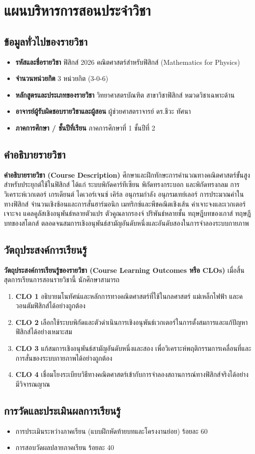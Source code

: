 \chapter*{แผนบริหารการสอนประจำวิชา}

\section*{ข้อมูลทั่วไปของรายวิชา}
\begin{itemize}
    \item \textbf{รหัสและชื่อรายวิชา} ฟิสิกส์ 2026 คณิตศาสตร์สำหรับฟิสิกส์ (Mathematics for Physics)
    \item \textbf{จำนวนหน่วยกิต} 3 หน่วยกิต (3-0-6)
    \item \textbf{หลักสูตรและประเภทของรายวิชา} วิทยาศาสตรบัณฑิต สาขาวิชาฟิสิกส์ หมวดวิชาเฉพาะด้าน
    \item \textbf{อาจารย์ผู้รับผิดชอบรายวิชาและผู้สอน} ผู้ช่วยศาสตราจารย์ ดร.ชีวะ ทัศนา
    \item \textbf{ภาคการศึกษา / ชั้นปีที่เรียน} ภาคการศึกษาที่ 1 ชั้นปีที่ 2
\end{itemize}

\section*{คำอธิบายรายวิชา}
\textbf{คำอธิบายรายวิชา (Course Description)} ศึกษาและฝึกทักษะการคำนวณทางคณิตศาสตร์ขั้นสูงสำหรับประยุกต์ใช้ในฟิสิกส์ ได้แก่ ระบบพิกัดคาร์ทีเซียน พิกัดทรงกระบอก และพิกัดทรงกลม การวิเคราะห์เวกเตอร์ เกรเดียนต์ ไดเวอร์เจนซ์ เคิร์ล อนุกรมกำลัง อนุกรมเทย์เลอร์ การประมาณค่าในทางฟิสิกส์ จำนวนเชิงซ้อนและการสั่นฮาร์มอนิก เมทริกซ์และพีชคณิตเชิงเส้น ค่าเจาะจงและเวกเตอร์เจาะจง แคลคูลัสเชิงอนุพันธ์หลายตัวแปร ตัวคูณลากรองจ์ ปริพันธ์หลายชั้น ทฤษฎีบทของเกาส์ ทฤษฎีบทของสโตกส์ ตลอดจนสมการเชิงอนุพันธ์สามัญอันดับหนึ่งและอันดับสองในการจำลองระบบกายภาพ

\section*{วัตถุประสงค์การเรียนรู้}
\textbf{วัตถุประสงค์การเรียนรู้ของรายวิชา (Course Learning Outcomes หรือ CLOs)} เมื่อสิ้นสุดการเรียนการสอนรายวิชานี้ นักศึกษาสามารถ
\begin{enumerate}
    \item \textbf{CLO 1} อธิบายมโนทัศน์และหลักการทางคณิตศาสตร์ที่ใช้ในกลศาสตร์ แม่เหล็กไฟฟ้า และควอนตัมฟิสิกส์ได้อย่างถูกต้อง
    \item \textbf{CLO 2} เลือกใช้ระบบพิกัดและตัวดำเนินการเชิงอนุพันธ์เวกเตอร์ในการตั้งสมการและแก้ปัญหาฟิสิกส์ได้อย่างเหมาะสม
    \item \textbf{CLO 3} แก้สมการเชิงอนุพันธ์สามัญอันดับหนึ่งและสอง เพื่อวิเคราะห์พฤติกรรมการเคลื่อนที่และการสั่นของระบบกายภาพได้อย่างถูกต้อง
    \item \textbf{CLO 4} เชื่อมโยงระเบียบวิธีทางคณิตศาสตร์เข้ากับการจำลองสถานการณ์ทางฟิสิกส์จริงได้อย่างมีวิจารณญาณ
\end{enumerate}

\section*{การวัดและประเมินผลการเรียนรู้}
\begin{itemize}
    \item การประเมินระหว่างภาคเรียน (แบบฝึกหัดท้ายบทและโครงงานย่อย) ร้อยละ 60
    \item การสอบวัดผลปลายภาคเรียน ร้อยละ 40
\end{itemize}
